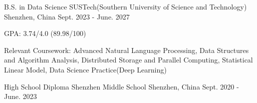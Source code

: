 

\begin{cventries}

  \cventry
    {B.S. in Data Science} %
    {SUSTech(Southern University of Science and Technology)} %
    {Shenzhen, China} %
    {Sept. 2023 - June. 2027} %
    {
      \begin{cvitems} %
        \item {GPA: 3.74/4.0 (89.98/100)}
        \item {Relevant Coursework: Advanced Natural Language Processing, Data Structures and Algorithm Analysis, Distributed Storage and Parallel Computing, Statistical Linear Model, Data Science Practice(Deep Learning)}
      \end{cvitems}
    }

  \cventry
    {High School Diploma} %
    {Shenzhen Middle School} %
    {Shenzhen, China} %
    {Sept. 2020 - June. 2023} %
    {
    }

\end{cventries}

